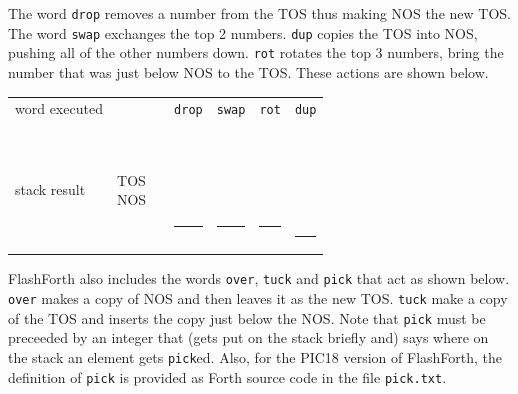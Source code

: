 \documentclass[12pt,a4paper]{article}
\begin{document}
\medskip
The word \verb!drop! removes a number from the TOS thus making NOS the new TOS.
The word \verb!swap! exchanges the top 2 numbers.
\verb!dup! copies the TOS into NOS, pushing all of the other numbers down.
\verb!rot! rotates the top 3 numbers, bring the number that was just below NOS to the TOS.
These actions are shown below.
\begin{center}
 \begin{tabular}{lc|ccccc}
 word executed & & & \verb!drop! & \verb!swap! & \verb!rot! & \verb!dup! \\
 \\
 stack result  
 & \parbox[t]{35pt}{TOS \\ NOS} 
 & \parbox[t]{30pt}{ \\  \\  \\  \\ \rule{30pt}{2pt}} 
 & \parbox[t]{30pt}{ \\  \\  \\ \rule{30pt}{2pt}}
 & \parbox[t]{30pt}{ \\  \\  \\ \rule{30pt}{2pt}}
 & \parbox[t]{30pt}{ \\  \\  \\ \rule{30pt}{2pt}}
 & \parbox[t]{30pt}{ \\  \\  \\  \\ \rule{30pt}{2pt}}
 \end{tabular}

\end{center}
FlashForth also includes the words \verb!over!, \verb!tuck! and \verb!pick! that act as shown below.
\verb!over! makes a copy of NOS and then leaves it as the new TOS.
\verb!tuck! make a copy of the TOS and inserts the copy just below the NOS.
Note that \verb!pick! must be preceeded by an integer that (gets put on the stack briefly and) 
says where on the stack an element gets \verb!pick!ed.
Also, for the PIC18 version of FlashForth, 
the definition of \verb!pick! is provided as Forth source code in the file \verb!pick.txt!.
\end{document}

